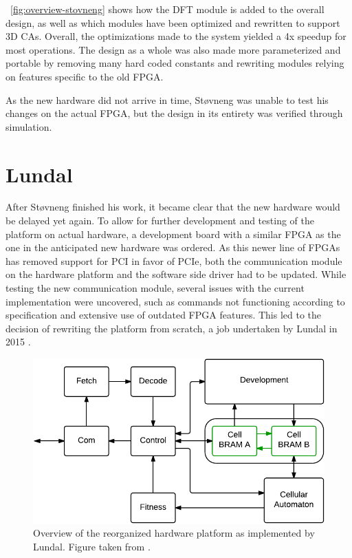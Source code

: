 \figurename~\ref{fig:overview-stovneng} shows how the DFT module is added to the
overall design, as well as which modules have been optimized and rewritten to
support 3D CAs. Overall, the optimizations made to the system yielded a 4x
speedup for most operations. The design as a whole was also made more
parameterized and portable by removing many hard coded constants and rewriting
modules relying on features specific to the old FPGA.

As the new hardware did not arrive in time, Støvneng was unable to test his
changes on the actual FPGA, but the design in its entirety was verified through
simulation.

\section{Lundal}

After Støvneng finished his work, it became clear that the new hardware would be
delayed yet again. To allow for further development and testing of the platform
on actual hardware, a development board with a similar FPGA as the one in the
anticipated new hardware was ordered. As this newer line of FPGAs has removed
support for PCI in favor of PCIe, both the communication module on the hardware
platform and the software side driver had to be updated. While testing the new
communication module, several issues with the current implementation were uncovered,
such as commands not functioning according to specification and extensive use of
outdated FPGA features. This led to the decision of rewriting the platform from
scratch, a job undertaken by Lundal in 2015 \cite{Lundal2015a}.


\begin{figure}[ht]
  \centering
  \includegraphics[width=0.8\linewidth]{fig/lundal-implementation-simple}
  \caption{
    Overview of the reorganized hardware platform as implemented by Lundal.
    Figure taken from \cite{Lundal2015a}. \label{fig:lundal-implementation-simple}
  }
\end{figure}

